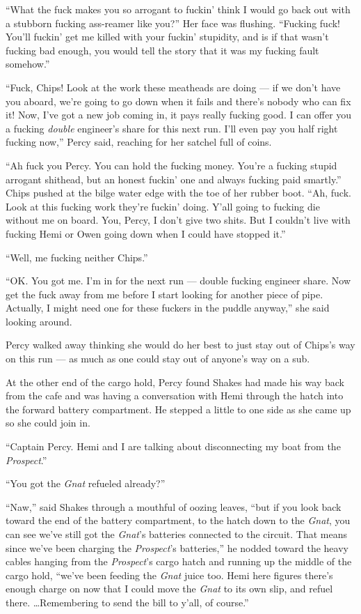 \documentclass[
]{scrbook}
\begin{document}
``What the fuck makes you so arrogant to fuckin' think I would go back
out with a stubborn fucking ass-reamer like you?'' Her face was
flushing. ``Fucking fuck! You'll fuckin' get me killed with your fuckin'
stupidity, and is if that wasn't fucking bad enough, you would tell the
story that it was my fucking fault somehow.''

``Fuck, Chips! Look at the work these meatheads are doing --- if we
don't have you aboard, we're going to go down when it fails and there's
nobody who can fix it! Now, I've got a new job coming in, it pays really
fucking good. I can offer you a fucking \emph{double} engineer's share
for this next run. I'll even pay you half right fucking now,'' Percy
said, reaching for her satchel full of coins.

``Ah fuck you Percy. You can hold the fucking money. You're a fucking
stupid arrogant shithead, but an honest fuckin' one and always fucking
paid smartly.'' Chips pushed at the bilge water edge with the toe of her
rubber boot. ``Ah, fuck. Look at this fucking work they're fuckin'
doing. Y'all going to fucking die without me on board. You, Percy, I
don't give two shits. But I couldn't live with fucking Hemi or Owen
going down when I could have stopped it.''

``Well, me fucking neither Chips.''

``OK. You got me. I'm in for the next run --- double fucking engineer
share. Now get the fuck away from me before I start looking for another
piece of pipe. Actually, I might need one for these fuckers in the
puddle anyway,'' she said looking around.

Percy walked away thinking she would do her best to just stay out of
Chips's way on this run --- as much as one could stay out of anyone's
way on a sub.

\bigskip

At the other end of the cargo hold, Percy found Shakes had made his way
back from the cafe and was having a conversation with Hemi through the
hatch into the forward battery compartment. He stepped a little to one
side as she came up so she could join in.

``Captain Percy. Hemi and I are talking about disconnecting my boat from
the \emph{Prospect}.''

``You got the \emph{Gnat} refueled already?''

``Naw,'' said Shakes through a mouthful of oozing leaves, ``but if you
look back toward the end of the battery compartment, to the hatch down
to the \emph{Gnat}, you can see we've still got the \emph{Gnat}'s
batteries connected to the circuit. That means since we've been charging
the \emph{Prospect}'s batteries,'' he nodded toward the heavy cables
hanging from the \emph{Prospect}'s cargo hatch and running up the middle
of the cargo hold, ``we've been feeding the \emph{Gnat} juice too. Hemi
here figures there's enough charge on now that I could move the
\emph{Gnat} to its own slip, and refuel there. \ldots Remembering to
send the bill to y'all, of course.''
\end{document}
